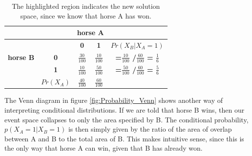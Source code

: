 \documentclass[11pt,fullpage]{book}
\begin{document}
\begin{table}[htbp]
  \centering
    \begin{tabular}{rrccr}
    \toprule
          &       & \multicolumn{2}{c}{\textbf{horse A}} &  \\
    \midrule
          &       & \textbf{0} & \textbf{1} & \multicolumn{1}{c}{\textbf{$Pr(X_B|X_A=1)$}} \\
    \multicolumn{1}{c}{\textbf{horse B}} & \multicolumn{1}{c}{\textbf{0}} & $\frac{30}{100}$   & {\color{blue}$\frac{10}{100}$ }   & \multicolumn{1}{c}{\textbf{=$\frac{10}{100}$ /$\frac{60}{100}$  = $\frac{1}{6}$ }} \\
    \multicolumn{1}{c}{} & \multicolumn{1}{c}{\textbf{1}} & $\frac{10}{100}$   & {\color{blue}$\frac{50}{100}$ }   & \multicolumn{1}{c}{\textbf{=$\frac{50}{100}$ /$\frac{60}{100}$  = $\frac{5}{6}$ }} \\
          & \multicolumn{1}{c}{\textbf{$Pr(X_A)$}} & \textbf{$\frac{40}{100}$ } & {\color{blue}\textbf{$\frac{60}{100}$ }} & \multicolumn{1}{c}{} \\
    \bottomrule
    \end{tabular}%
\caption{The highlighted region indicates the new solution space, since we know that horse A has won.}
\label{tab:Probability_coinsConditionalDiscrete}
\end{table}

The Venn diagram in figure \ref{fig:Probability_Venn} shows another way of interpreting conditional distributions. If we are told that horse B wins, then our event space collapses to only the area specified by B. The conditional probability, $p(X_A=1|X_B=1)$ is then simply given by the ratio of the area of overlap between A and B to the total area of B. This makes intuitive sense, since this is the only way that horse A can win, given that B has already won.
\end{document}
